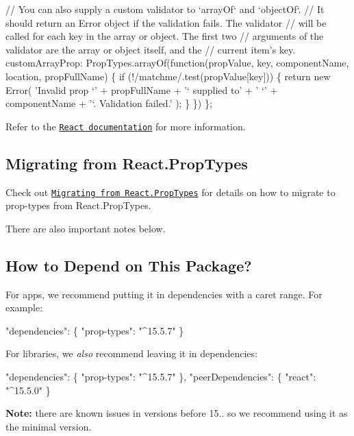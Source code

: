 \begin{DoxyCode}
  // You can also supply a custom validator to `arrayOf` and `objectOf`.
  // It should return an Error object if the validation fails. The validator
  // will be called for each key in the array or object. The first two
  // arguments of the validator are the array or object itself, and the
  // current item's key.
  customArrayProp: PropTypes.arrayOf(function(propValue, key, componentName, location, propFullName) \{
    if (!/matchme/.test(propValue[key])) \{
      return new Error(
        'Invalid prop `' + propFullName + '` supplied to' +
        ' `' + componentName + '`. Validation failed.'
      );
    \}
  \})
\};
\end{DoxyCode}


Refer to the \href{https://facebook.github.io/react/docs/typechecking-with-proptypes.html}{\tt React documentation} for more information.

\subsection*{Migrating from React.\+Prop\+Types}

Check out \href{https://facebook.github.io/react/blog/2017/04/07/react-v15.5.0.html#migrating-from-react.proptypes}{\tt Migrating from React.\+Prop\+Types} for details on how to migrate to {\ttfamily prop-\/types} from {\ttfamily React.\+Prop\+Types}.

There are also important notes below.

\subsection*{How to Depend on This Package?}

For apps, we recommend putting it in {\ttfamily dependencies} with a caret range. For example\+:


\begin{DoxyCode}
"dependencies": \{
  "prop-types": "^15.5.7" 
\}
\end{DoxyCode}


For libraries, we {\itshape also} recommend leaving it in {\ttfamily dependencies}\+:


\begin{DoxyCode}
"dependencies": \{
  "prop-types": "^15.5.7" 
\},
"peerDependencies": \{
  "react": "^15.5.0" 
\}
\end{DoxyCode}


{\bfseries Note\+:} there are known issues in versions before 15.. so we recommend using it as the minimal version.

